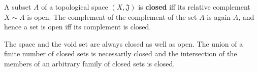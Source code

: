 A subset $A$ of a topological space $(X, \mathfrak{J})$ is \textbf{closed} iff its relative complement $X \sim A$ is open. The complement of the complement of the set $A$ is again $A$, and hence a set is open iff its complement is closed.

The space and the void set are always closed as well as open. The union of a finite number of closed sets is necessarily closed and the intersection of the members of an arbitrary family of closed sets is closed.

